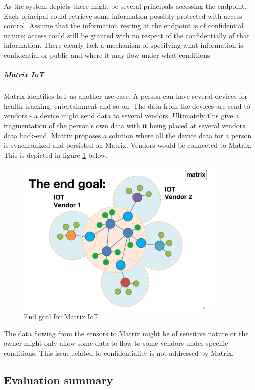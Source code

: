 As the system depicts there might be several principals accessing the endpoint. Each principal could retrieve some information possibly protected with access control. Assume that the information resting at the endpoint is of confidential nature; access could still be granted with no respect of the confidentially of that information. There clearly lack a mechanism of specifying what information is confidential or public and where it may flow under what conditions.  

\subparagraph{Matrix IoT}
Matrix identifies IoT as another use case. A person can have several devices for health tracking, entertainment and so on. The data from the devices are send to vendors - a device might send data to several vendors. Ultimately this give a fragmentation of the person's own data with it being placed at several vendors data back-end. Matrix proposes a solution where all the device data for a person is synchronized and persisted on Matrix. Vendors would be connected to Matrix. This is depicted in figure \ref{fig:matrix_iot} below. 

\begin{figure}[H]
	\centering
	\includegraphics[width=10cm]{figures/matrix_iot.png}
	\caption{End goal for Matrix IoT}
	\label{fig:matrix_iot}
\end{figure}

The data flowing from the sensors to Matrix might be of sensitive nature or the owner might only allow some data to flow to some vendors under specific conditions. This issue related to confidentiality is not addressed by Matrix. 

\subsection{Evaluation summary}

